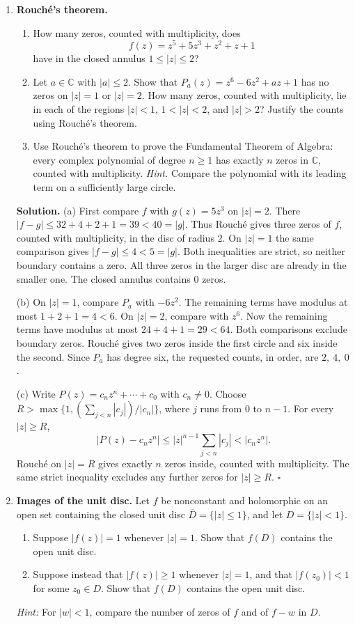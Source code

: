 \documentclass[11pt,reqno]{amsart}
\newcommand{\C}{\mathbb{C}}
\newenvironment{solution}
  {\par\smallskip\begin{tcolorbox}[breakable,enhanced,colback=solblue,colframe=solframe,
   boxrule=0.5pt,arc=2pt,left=6pt,right=6pt,top=4pt,bottom=4pt]\setlength{\abovedisplayskip}{7pt}\setlength{\belowdisplayskip}{7pt}\noindent\textbf{Solution.}}
  {\hfill$\square$\end{tcolorbox}\par\medskip}
\begin{document}
\begin{enumerate}
\newpage
\item \textbf{Rouch\'e's theorem.}
\begin{enumerate}
\item How many zeros, counted with multiplicity, does
\[
 f(z)=z^5+5z^3+z^2+z+1
\]
have in the closed annulus $1\leq|z|\leq2$?

\item Let $a\in\C$ with $|a|\leq2$. Show that
$P_a(z)=z^6-6z^2+az+1$ has no zeros on $|z|=1$ or $|z|=2$.
How many zeros, counted with multiplicity, lie in each of the regions
$|z|<1$, $1<|z|<2$, and $|z|>2$? Justify the counts using
Rouch\'e's theorem.
\item Use Rouch\'e's theorem to prove the Fundamental Theorem of Algebra:
every complex polynomial of degree $n\geq1$ has exactly $n$ zeros in
$\C$, counted with multiplicity. \emph{Hint.} Compare the polynomial
with its leading term on a sufficiently large circle.
\end{enumerate}

\begin{solution}
(a) First compare $f$ with $g(z)=5z^3$ on $|z|=2$. There
$|f-g|\le32+4+2+1=39<40=|g|$. Thus Rouch\'e gives three zeros of $f$, counted with multiplicity, in the disc of radius $2$. On $|z|=1$
the same comparison gives $|f-g|\le4<5=|g|$. Both inequalities are
strict, so neither boundary contains a zero. All three zeros in the larger
disc are already in the smaller one. The closed annulus contains
$\boxed{0}$ zeros.

\smallskip
(b) On $|z|=1$, compare $P_a$ with $-6z^2$. The remaining terms have
modulus at most $1+2+1=4<6$. On $|z|=2$, compare with $z^6$.
Now the remaining terms have modulus at most $24+4+1=29<64$.
Both comparisons exclude boundary zeros. Rouch\'e gives two zeros inside
the first circle and six inside the second. Since $P_a$ has degree six,
the requested counts, in order, are $\boxed{2,\ 4,\ 0}$.

\smallskip
(c) Write $P(z)=c_nz^n+\cdots+c_0$ with $c_n\ne0$.
Choose $R>\max\{1,(\sum_{j<n}|c_j|)/|c_n|\}$, where $j$ runs from $0$
to $n-1$. For every $|z|\ge R$,
\[
 |P(z)-c_nz^n|\le |z|^{n-1}\sum_{j<n}|c_j|<|c_nz^n|.
\]
Rouch\'e on $|z|=R$ gives exactly $n$ zeros inside, counted with
multiplicity. The same strict inequality excludes any further zeros for
$|z|\ge R$.
\end{solution}


\newpage
\item \textbf{Images of the unit disc.}
Let $f$ be nonconstant and holomorphic on an open set containing the
closed unit disc $\overline{D}=\{|z|\leq1\}$, and let $D=\{|z|<1\}$.
\begin{enumerate}
\item Suppose $|f(z)|=1$ whenever $|z|=1$. Show that $f(D)$ contains
the open unit disc.
\item Suppose instead that $|f(z)|\geq1$ whenever $|z|=1$, and that
$|f(z_0)|<1$ for some $z_0\in D$. Show that $f(D)$ contains the open
unit disc.
\end{enumerate}
\emph{Hint:} For $|w|<1$, compare the number of zeros of $f$ and of
$f-w$ in $D$.


\end{enumerate}
\end{document}
